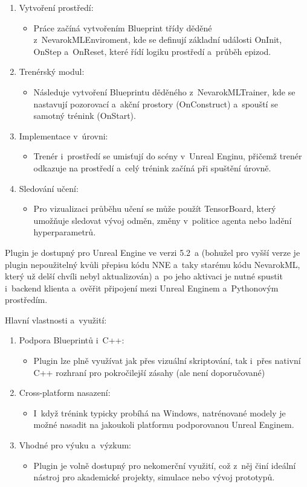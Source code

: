 \begin{enumerate}
\item Vytvoření prostředí:
\begin{itemize}
\item Práce začíná vytvořením Blueprint třídy děděné z~NevarokMLEnviroment, kde se definují základní události OnInit, OnStep a~OnReset, které řídí logiku prostředí a~průběh epizod.
\end{itemize}
\item Trenérský modul:
\begin{itemize}
\item Následuje vytvoření Blueprintu děděného z~NevarokMLTrainer, kde se nastavují pozorovací a~akční prostory (OnConstruct) a~spouští se samotný trénink (OnStart).
\end{itemize}
\item Implementace v~úrovni:
\begin{itemize}
\item Trenér i~prostředí se umisťují do scény v~Unreal Enginu, přičemž trenér odkazuje na prostředí a~celý trénink začíná při spuštění úrovně.
\end{itemize}

\item Sledování učení:
\begin{itemize}
\item Pro vizualizaci průběhu učení se může použít TensorBoard, který umožňuje sledovat vývoj odměn, změny v~politice agenta nebo ladění hyperparametrů.
\end{itemize}
\end{enumerate}

Plugin je dostupný pro Unreal Engine ve verzi 5.2~a  (bohužel pro vyšší verze je plugin nepoužitelný kvůli přepisu kódu NNE a~taky starému kódu NevarokML, který už delší chvíli nebyl aktualizován) a~po jeho aktivaci je nutné spustit i~backend klienta a~ověřit připojení mezi Unreal Enginem a~Pythonovým prostředím.

Hlavní vlastnosti a~využití:
\begin{enumerate}
\item Podpora Blueprintů i~C++:
\begin{itemize}
\item Plugin lze plně využívat jak přes vizuální skriptování, tak i~přes nativní C++ rozhraní pro pokročilejší zásahy (ale není doporučované)
\end{itemize}
\item Cross-platform nasazení:
\begin{itemize}
\item I~když trénink typicky probíhá na Windows, natrénované modely je možné nasadit na jakoukoli platformu podporovanou Unreal Enginem.
\end{itemize}
\item Vhodné pro výuku a~výzkum:
\begin{itemize}
\item Plugin je volně dostupný pro nekomerční využití, což z~něj činí ideální nástroj pro akademické projekty, simulace nebo vývoj prototypů.
\end{itemize}
\end{enumerate}

